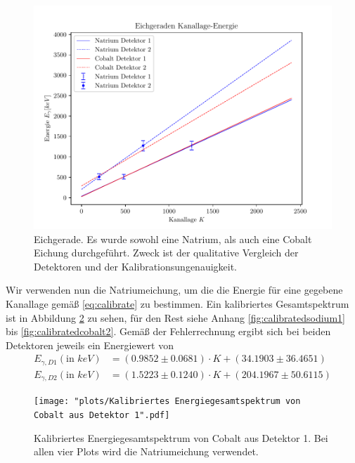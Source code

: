 \documentclass[%
aps,
onecolumn,
11pt,
tightenlines,
nofootinbib,
superscriptaddress,
floatfix,
prd,
]{revtex4-2}
\begin{document}
\begin{figure}[H]
	\centering
	\includegraphics[scale=.9]{plots/Eichgeraden.pdf}
	\caption{Eichgerade. Es wurde sowohl eine Natrium, als auch eine Cobalt Eichung durchgeführt. Zweck ist der qualitative Vergleich der Detektoren und der Kalibrationsungenauigkeit.}
	\label{fig:calibratecurve}
\end{figure}
Wir verwenden nun die Natriumeichung, um die die Energie für eine gegebene Kanallage gemäß \ref{eq:calibrate} zu bestimmen. Ein kalibriertes Gesamtspektrum ist in Abbildung \ref{fig:calibratespectrum} zu sehen, für den Rest siehe Anhang \ref{fig:calibratedsodium1} bis \ref{fig:calibratedcobalt2}. Gemäß der Fehlerrechnung ergibt sich bei beiden Detektoren jeweils ein Energiewert von
\begin{align}
	E_{\gamma, D1} (\text{in $keV$})&= (0.9852 \pm 0.0681)\cdot K + (34.1903 \pm 36.4651)\\
	E_{\gamma, D2} (\text{in $keV$})&= (1.5223 \pm 0.1240)\cdot K + (204.1967 \pm 50.6115) 
\end{align}
\begin{figure}[H]
	\centering
	\texttt{[image: "plots/Kalibriertes Energiegesamtspektrum von Cobalt aus Detektor 1".pdf]}
	\caption{Kalibriertes Energiegesamtspektrum von Cobalt aus Detektor 1. Bei allen vier Plots wird die Natriumeichung verwendet.}
	\label{fig:calibratespectrum}
\end{figure}
\end{document}
